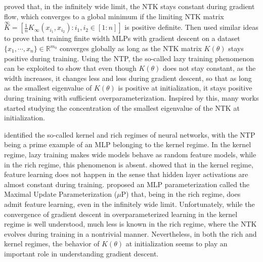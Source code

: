 \documentclass[twoside,11pt]{article}
\newcommand{\R}{\mathbb{R}}
\newcommand{\limiting}[1]{\overset{\scriptscriptstyle\infty}{#1}}
\begin{document}
\citet{Jacotetal2018} proved that, in the infinitely wide limit, the NTK stays constant during gradient flow, which converges to a global minimum if the limiting NTK matrix $\limiting{K} = [\frac{1}{n} K_\infty(x_{i_1},x_{i_2}) : i_1,i_2 \in [1:n]]$ is positive definite. Then \citet{Duetal2018, Suetal2019, Oymaketal2019a, Aroraetal2019, Oymaketal2020, Songetal2021, Duetal2019, Zouetal2019, Nguyenetal2020, Nguyen2021, Liuetal2022} used similar ideas to prove that training finite width MLPs with gradient descent on a dataset $\{x_1,\cdots,x_n\} \in \R^{m_0}$ converges globally as long as the NTK matrix $K(\theta)$ stays positive during training. Using the NTP, the so-called lazy training phenomenon \citep{Chizatetal2019} can be exploited to show that even though $K(\theta)$ does not stay constant, as the width increases, it changes less and less during gradient descent, so that as long as the smallest eigenvalue of $K(\theta)$ is positive at initialization, it stays positive during training with sufficient overparameterization. Inspired by this, many works \citep{Montanarietal2020, Nguyenetal2021, Wangetal2021, Bombarietal2022, Banerjeeetal2023} started studying the concentration of the smallest eigenvalue of the NTK at initialization.

\citet{Woodworthetal2020} identified the so-called kernel and rich regimes of neural networks, with the NTP being a prime example of an MLP belonging to the kernel regime. In the kernel regime, lazy training makes wide models behave as random feature models, while in the rich regime, this phenomenon is absent. \citet{Yangetal2021} showed that in the kernel regime, feature learning does not happen in the sense that hidden layer activations are almost constant during training. \citet{Yangetal2021} proposed an MLP parameterization called the Maximal Update Parameterization ($\mu$P) that, being in the rich regime, does admit feature learning, even in the infinitely wide limit. Unfortunately, while the convergence of gradient descent in overparameterized learning in the kernel regime is well understood, much less is known in the rich regime, where the NTK evolves during training in a nontrivial manner. Nevertheless, in both the rich and kernel regimes, the behavior of $K(\theta)$ at initialization seems to play an important role in understanding gradient descent.
\end{document}

